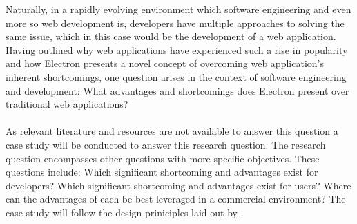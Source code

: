 
Naturally, in a rapidly evolving environment which software engineering and even more so 
web development is, developers have multiple approaches to solving the same issue, which 
in this case would be the development of a web application.
Having outlined why web applications have experienced such a rise in popularity and how
Electron presents a novel concept of overcoming web application's inherent shortcomings, 
one question arises in the context of software engineering and development:
What advantages and shortcomings does Electron present over traditional web applications? \paragraph{}
As relevant literature and resources are not available to answer this question a case study
will be conducted to answer this research question. 
The research question encompasses other questions with more specific objectives. 
These questions include: 
Which significant shortcoming and advantages exist for developers?
Which significant shortcoming and advantages exist for users?
Where can the advantages of each be best leveraged in a commercial environment?
The case study will follow the design priniciples laid out by \textcite{caseStudy}.